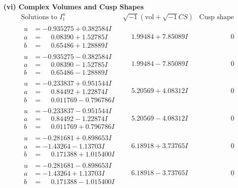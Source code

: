 \documentclass[1p]{elsarticle_modified}
\theoremstyle{definition}
\newcommand{\I}{\sqrt{-1}}
\begin{document}
\newpage\flushleft \textbf{(vi) Complex Volumes and Cusp Shapes}
$$\begin{array}{c|c|c}  
\text{Solutions to }I^u_{1}& \I (\text{vol} + \sqrt{-1}CS) & \text{Cusp shape}\\
 \hline 
\begin{aligned}
u &= -0.935275 + 0.382584 I \\
a &= \phantom{-}0.08390 + 1.52785 I \\
b &= \phantom{-}0.65486 + 1.28889 I\end{aligned}
 & \phantom{-}1.99484 + 7.85089 I & \phantom{-0.000000 } 0 \\ \hline\begin{aligned}
u &= -0.935275 - 0.382584 I \\
a &= \phantom{-}0.08390 - 1.52785 I \\
b &= \phantom{-}0.65486 - 1.28889 I\end{aligned}
 & \phantom{-}1.99484 - 7.85089 I & \phantom{-0.000000 } 0 \\ \hline\begin{aligned}
u &= -0.233837 + 0.951544 I \\
a &= \phantom{-}0.84492 + 1.22874 I \\
b &= \phantom{-}0.011769 - 0.796786 I\end{aligned}
 & \phantom{-}5.20569 + 4.08312 I & \phantom{-0.000000 } 0 \\ \hline\begin{aligned}
u &= -0.233837 - 0.951544 I \\
a &= \phantom{-}0.84492 - 1.22874 I \\
b &= \phantom{-}0.011769 + 0.796786 I\end{aligned}
 & \phantom{-}5.20569 - 4.08312 I & \phantom{-0.000000 } 0 \\ \hline\begin{aligned}
u &= -0.281681 + 0.898653 I \\
a &= -1.43264 - 1.13703 I \\
b &= \phantom{-}0.171388 + 1.015400 I\end{aligned}
 & \phantom{-}6.18918 + 3.73765 I & \phantom{-0.000000 } 0 \\ \hline\begin{aligned}
u &= -0.281681 - 0.898653 I \\
a &= -1.43264 + 1.13703 I \\
b &= \phantom{-}0.171388 - 1.015400 I\end{aligned}
 & \phantom{-}6.18918 - 3.73765 I & \phantom{-0.000000 } 0 \\ \hline\begin{aligned}

\end{aligned}
\end{array}$$
\end{document}

